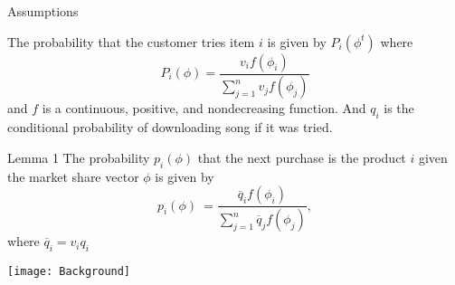 \begin{frame}[c]{Assumptions}

%

The probability that the customer
tries item $i$ is given by $P_i(\phi^t)$ where
\begin{equation}
\label{probatry}
P_i(\phi) =  \frac{v_{i} f(\phi_i)}{\sum_{j=1}^n v_{j} f(\phi_j)}
\end{equation}
and $f$ is a continuous, positive, and nondecreasing function. And $q_i$ is the conditional probability of downloading song if it was tried.

\begin{exampleblock}{Lemma 1}
The probability $p_i(\phi)$ that the next purchase is the product $i$
given the market share vector $\phi$ is given by
\begin{equation}
p_i(\phi) \ = \frac{ \overline{q}_i f(\phi_i)}{\sum_{j=1}^n \overline{q}_j f(\phi_j)} \label{probanext},
\end{equation}
where $\overline{q}_i=v_iq_i$
\end{exampleblock}

\end{frame}


\addtocounter{framenumber}{-1}
{	
\begin{frame}[c]
\begin{center}

	\vspace{10em}
	 \texttt{[image: Background]}\\
	\vspace{.5em}
	
\end{center}
\end{frame}
}
	
